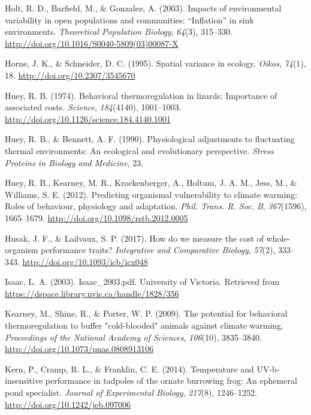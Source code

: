 \documentclass[12pt,twoside]{reedthesis}
\begin{document}
\leavevmode\hypertarget{ref-holt_impacts_2003}{}%
Holt, R. D., Barfield, M., \& Gonzalez, A. (2003). Impacts of environmental variability in open populations and communities: ``Inflation'' in sink environments. \emph{Theoretical Population Biology}, \emph{64}(3), 315--330. \url{http://doi.org/10.1016/S0040-5809(03)00087-X}

\leavevmode\hypertarget{ref-horne_spatial_1995}{}%
Horne, J. K., \& Schneider, D. C. (1995). Spatial variance in ecology. \emph{Oikos}, \emph{74}(1), 18. \url{http://doi.org/10.2307/3545670}

\leavevmode\hypertarget{ref-huey_behavioral_1974}{}%
Huey, R. B. (1974). Behavioral thermoregulation in lizards: Importance of associated costs. \emph{Science}, \emph{184}(4140), 1001--1003. \url{http://doi.org/10.1126/science.184.4140.1001}

\leavevmode\hypertarget{ref-huey_physiological_1990}{}%
Huey, R. B., \& Bennett, A. F. (1990). Physiological adjustments to fluctuating thermal environments: An ecological and evolutionary perspective. \emph{Stress Proteins in Biology and Medicine}, 23.

\leavevmode\hypertarget{ref-huey_predicting_2012}{}%
Huey, R. B., Kearney, M. R., Krockenberger, A., Holtum, J. A. M., Jess, M., \& Williams, S. E. (2012). Predicting organismal vulnerability to climate warming: Roles of behaviour, physiology and adaptation. \emph{Phil. Trans. R. Soc. B}, \emph{367}(1596), 1665--1679. \url{http://doi.org/10.1098/rstb.2012.0005}

\leavevmode\hypertarget{ref-husak_how_2017}{}%
Husak, J. F., \& Lailvaux, S. P. (2017). How do we measure the cost of whole-organism performance traits? \emph{Integrative and Comparative Biology}, \emph{57}(2), 333--343. \url{http://doi.org/10.1093/icb/icx048}

\leavevmode\hypertarget{ref-isaac_isaac_2003pdf_2003}{}%
Isaac, L. A. (2003). Isaac\_2003.pdf. University of Victoria. Retrieved from \url{https://dspace.library.uvic.ca/handle/1828/356}

\leavevmode\hypertarget{ref-kearney_potential_2009}{}%
Kearney, M., Shine, R., \& Porter, W. P. (2009). The potential for behavioral thermoregulation to buffer "cold-blooded" animals against climate warming. \emph{Proceedings of the National Academy of Sciences}, \emph{106}(10), 3835--3840. \url{http://doi.org/10.1073/pnas.0808913106}

\leavevmode\hypertarget{ref-kern_temperature_2014}{}%
Kern, P., Cramp, R. L., \& Franklin, C. E. (2014). Temperature and UV-b-insensitive performance in tadpoles of the ornate burrowing frog: An ephemeral pond specialist. \emph{Journal of Experimental Biology}, \emph{217}(8), 1246--1252. \url{http://doi.org/10.1242/jeb.097006}
\end{document}
